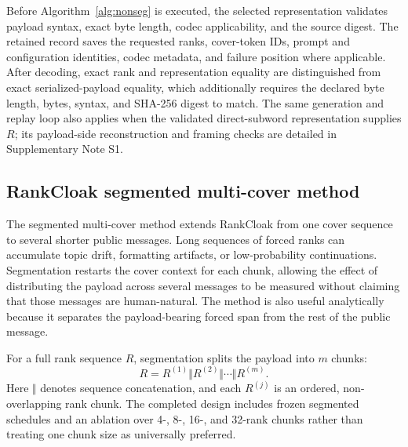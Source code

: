 \documentclass[fleqn,10pt]{wlscirep}
\begin{document}
Before Algorithm~\ref{alg:nonseg} is executed, the selected representation validates payload syntax, exact byte length, codec applicability, and the source digest. The retained record saves the requested ranks, cover-token IDs, prompt and configuration identities, codec metadata, and failure position where applicable. After decoding, exact rank and representation equality are distinguished from exact serialized-payload equality, which additionally requires the declared byte length, bytes, syntax, and SHA-256 digest to match. The same generation and replay loop also applies when the validated direct-subword representation supplies \(R\); its payload-side reconstruction and framing checks are detailed in Supplementary Note S1.

\subsection*{RankCloak segmented multi-cover method}\label{sec:encoding-method}

The segmented multi-cover method extends RankCloak from one cover sequence to several shorter public messages. Long sequences of forced ranks can accumulate topic drift, formatting artifacts, or low-probability continuations. Segmentation restarts the cover context for each chunk, allowing the effect of distributing the payload across several messages to be measured without claiming that those messages are human-natural. The method is also useful analytically because it separates the payload-bearing forced span from the rest of the public message.

For a full rank sequence \(R\), segmentation splits the payload into \(m\) chunks:
\begin{equation}
R = R^{(1)}\Vert R^{(2)}\Vert \cdots \Vert R^{(m)}.
\label{eq:rank-segmentation}
\end{equation}
Here \(\Vert\) denotes sequence concatenation, and each \(R^{(j)}\) is an ordered, non-overlapping rank chunk. The completed design includes frozen segmented schedules and an ablation over 4-, 8-, 16-, and 32-rank chunks rather than treating one chunk size as universally preferred.
\end{document}
